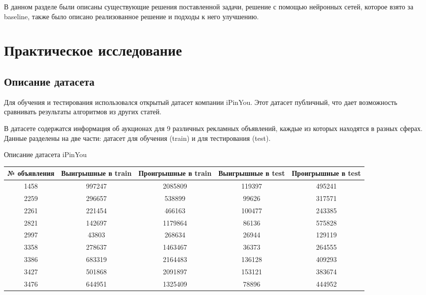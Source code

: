 \documentclass[times,specification,annotation]{itmo-student-thesis}
\begin{document}
\chapterconclusion

В данном разделе были описаны существующие решения поставленной задачи, 
решение с помощью нейронных сетей, которое взято за baseline, 
также было описано реализованное решение и подходы к него улучшению.

\chapter{Практическое исследование}

\section{Описание датасета}

Для обучения и тестирования использовался открытый датасет компании iPinYou.
Этот датасет публичный, что дает возможность сравнивать результаты алгоритмов из других статей. 

В датасете содержатся информация об аукционах для 9 различных рекламных объявлений, 
каждые из которых находятся в разных сферах. 
Данные разделены на две части: датасет для обучения (train) и для тестирования (test).

\begin{center}
    \label{table:ipinyou}
    \caption{Описание датасета iPinYou}
    \centering %
    \begin{tabular}{c c c c c}
        \hline
        № объявления & Выигрышные в train & Проигрышные в train & Выигрышные в test & Проигрышные в test \\ [0.3ex] %
        \hline
        1458 & 997247 & 2085809 & 119397 & 495241 \\
        2259 & 296657 & 538899 & 99626 & 317571 \\
        2261 & 221454 & 466163 & 100477 & 243385 \\
        2821 & 142697 & 1179864 & 86136 & 575828 \\
        2997 & 43803 & 268634 & 26944 & 129119 \\
        3358 & 278637 & 1463467 & 36373 & 264555 \\
        3386 & 683319 & 2164483 & 136128 & 409293 \\
        3427 & 501868 & 2091897 & 153121 & 383674 \\
        3476 & 644951 & 1325409 & 78896 & 444952 \\ [0.5ex] %
        \hline
    \end{tabular}
\end{center}
\end{document}
